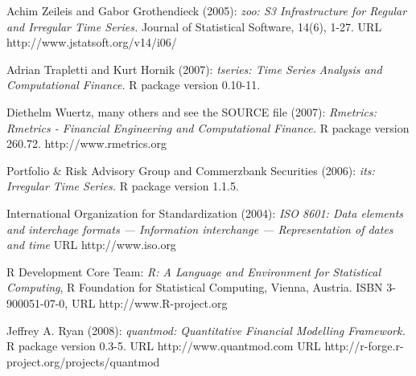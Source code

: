 \documentclass{article}
\begin{document}
\begin{thebibliography}{99}
 Achim Zeileis and Gabor Grothendieck (2005):
\emph{ zoo: S3 Infrastructure for Regular and Irregular Time Series.}
Journal of Statistical Software, 14(6), 1-27. URL http://www.jstatsoft.org/v14/i06/

 Adrian Trapletti and Kurt Hornik (2007):
\emph{tseries: Time Series Analysis and Computational Finance.} R package version 0.10-11.

 Diethelm Wuertz, many others and see the SOURCE file (2007):
\emph{Rmetrics: Rmetrics - Financial Engineering and Computational Finance.}
R package version 260.72. http://www.rmetrics.org

 Portfolio \& Risk Advisory Group and Commerzbank Securities (2006):
\emph{its: Irregular Time Series.} R package version 1.1.5.

 International Organization for Standardization (2004):
\emph{ISO 8601: Data elements and interchage formats ---
      Information interchange --- Representation of dates and time}
URL http://www.iso.org

 R Development Core Team:
\emph{R: A Language and Environment for Statistical Computing},
R Foundation for Statistical Computing, Vienna, Austria.
ISBN 3-900051-07-0, URL http://www.R-project.org

 Jeffrey A. Ryan (2008):
\emph{quantmod: Quantitative Financial Modelling Framework.}
R package version 0.3-5. URL http://www.quantmod.com
URL http://r-forge.r-project.org/projects/quantmod

\end{thebibliography}
\end{document}
